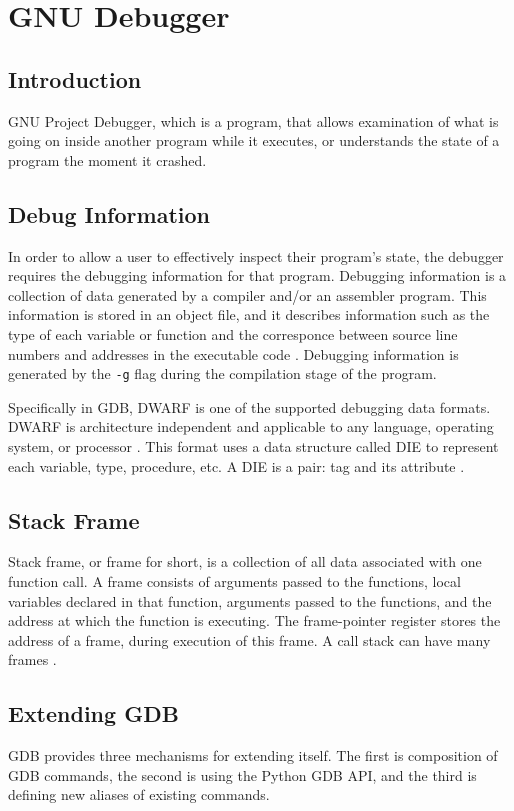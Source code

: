 \chapter{GNU Debugger} \label{GDB}
\section{Introduction}
GNU Project Debugger, which is a program, that allows examination of what is going on
inside another program while it executes, or understands the state of a program
the moment it crashed\cite{reference3}.

\section{Debug Information}
In order to allow a user to effectively inspect their program's state, the
debugger requires the debugging information for that program. Debugging
information is a collection of data generated by a compiler and/or an assembler
program. This information is stored in an object file, and it describes
information such as the type of each variable or function and
the corresponce between source line numbers and addresses in the executable
code \cite{reference6}. Debugging information is generated by the \verb|-g|
flag during the compilation stage of the
program.

Specifically in GDB, DWARF is one of the supported debugging data formats. DWARF is architecture
independent and applicable to any language, operating system, or processor \cite{reference7}. This format uses a data structure called DIE to represent
each variable, type, procedure, etc. A DIE is a pair: tag
and its attribute \cite{reference8}.

\section{Stack Frame}
Stack frame, or frame for short, is a collection of all data associated with
one function call. A frame consists of arguments passed to the functions, local variables declared in that
function, arguments passed to the functions, and the address at which the
function is executing. The frame-pointer register stores the address of a frame,
during execution of this frame. A call stack can have many frames \cite{reference12}.

\section{Extending GDB}
GDB provides three mechanisms for extending itself. The first is
composition of GDB commands, the second is using the Python GDB API, and the third is defining new aliases of existing commands.

